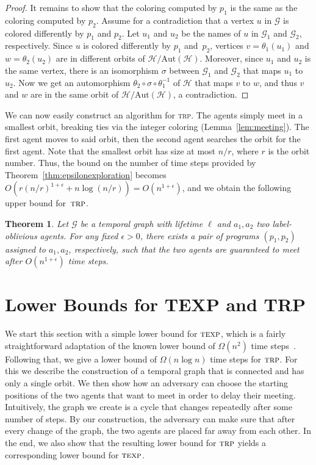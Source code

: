 \documentclass[10pt,a4paper]{article}
\newtheorem{theorem}{Theorem}[section]
\newcommand{\trp}{\textsc{trp}}
\newcommand{\texp}{\textsc{texp}}
\begin{document}
{\begin{proof}
It remains to show that the coloring computed by $p_1$ is the same as the
coloring computed by $p_2$. Assume for a contradiction that a vertex $u$ in
$\mathcal{G}$ is colored differently by $p_1$ and $p_2$. Let $u_1$ and $u_2$ be
the names of $u$ in $\mathcal{G}_1$ and $\mathcal{G}_2$, respectively. Since $u$
is colored differently by $p_1$ and~$p_2$, vertices $v=\theta_1(u_1)$ and
$w=\theta_2(u_2)$ are in different orbits of
$\mathcal{H}/\text{Aut}(\mathcal{H})$. Moreover, since $u_1$ and $u_2$ is the
same vertex, there is an isomorphism $\sigma$ between $\mathcal{G}_1$ and
$\mathcal{G}_2$ that maps $u_1$ to $u_2$. Now we get an automorphism
$\theta_2\circ \sigma \circ \theta_1^{-1}$ of $\mathcal{H}$ that maps $v$ to
$w$, and thus $v$ and $w$ are in the same orbit of
$\mathcal{H}/\text{Aut}(\mathcal{H})$, a contradiction. 
\end{proof}
}
\full{\proofmeeting}
We can now easily construct an algorithm for \textsc{trp}.  The agents
simply meet in a smallest orbit, breaking ties via the integer coloring
(Lemma~\ref{lem:meeting}). The first agent moves to said orbit,
then the
second agent searches the orbit for the first agent. Note that the smallest
orbit has size at most $n/r$, where $r$ is the orbit number. Thus, the bound
on the number of time steps provided by Theorem~\ref{thm:epsilonexploration}
becomes $O(r(n/r)^{1+\epsilon}+n\log (n/r))= O(n^{1+\epsilon})$, and we obtain
the following upper bound for~$\trp$.

\begin{theorem}\label{thm:rendezvous-time} Let $\mathcal{G}$ be a temporal graph
    with lifetime $\ell$ and $a_1, a_2$ two label-oblivious agents. For any
    fixed $\epsilon > 0$, there exists a pair of programs $(p_1, p_2)$ assigned
    to $a_1, a_2$, respectively, such that the two agents are guaranteed to meet
    after $O(n^{1+\epsilon})$ time steps.
\end{theorem}

\section{Lower Bounds for TEXP and TRP}
\label{sec:lower-bounds}

We start this section with a simple lower bound for $\texp$, which is a
{fairly straightforward adaptation}
of the known lower bound of $\Omega(n^2)$ time steps~\cite{ErlebachHK21}.
Following that, we give a lower bound of $\Omega(n \log n)$ time steps for
$\trp$. For this we describe the construction of a temporal graph that is
connected and has only a single orbit. We then show how an adversary can choose
the starting positions of the two agents that want to meet in order to delay
their meeting. Intuitively, the graph we create is a cycle that changes
repeatedly after some number of steps. By our construction, the adversary can
make sure that after every change of the graph, the two agents are placed far
away from each other. In the end, we also show that the resulting lower bound
for $\trp$ yields a corresponding lower bound for $\texp$.
\end{document}

